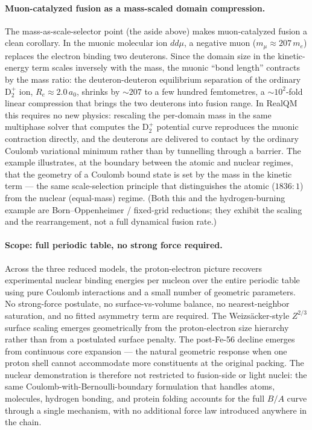 \documentclass[11pt]{article}
\begin{document}
\paragraph{Muon-catalyzed fusion as a mass-scaled domain compression.}
The mass-as-scale-selector point (the aside above) makes muon-catalyzed fusion a clean corollary. In
the muonic molecular ion $dd\mu$, a negative muon ($m_\mu \approx 207\,m_e$) replaces the electron
binding two deuterons. Since the domain size in the kinetic-energy term scales inversely with the
mass, the muonic ``bond length'' contracts by the mass ratio: the deuteron-deuteron equilibrium
separation of the ordinary $\mathrm{D}_2^+$ ion, $R_e \approx 2.0\,a_0$, shrinks by $\sim\! 207$ to a
few hundred femtometres, a $\sim\!10^2$-fold linear compression that brings the two deuterons into
fusion range. In RealQM this requires no new physics: rescaling the per-domain mass in the same
multiphase solver that computes the $\mathrm{D}_2^+$ potential curve reproduces the muonic contraction
directly, and the deuterons are delivered to contact by the ordinary Coulomb variational minimum
rather than by tunnelling through a barrier. The example illustrates, at the boundary between the
atomic and nuclear regimes, that the geometry of a Coulomb bound state is set by the mass in the
kinetic term --- the same scale-selection principle that distinguishes the atomic ($1836{:}1$) from
the nuclear (equal-mass) regime. (Both this and the hydrogen-burning example are Born--Oppenheimer /
fixed-grid reductions; they exhibit the scaling and the rearrangement, not a full dynamical fusion
rate.)

\paragraph{Scope: full periodic table, no strong force required.}
Across the three reduced models, the proton-electron picture recovers experimental nuclear binding energies per nucleon over the entire periodic table using pure Coulomb interactions and a small number of geometric parameters. No strong-force postulate, no surface-vs-volume balance, no nearest-neighbor saturation, and no fitted asymmetry term are required. The Weizsäcker-style $Z^{2/3}$ surface scaling emerges geometrically from the proton-electron size hierarchy rather than from a postulated surface penalty. The post-Fe-56 decline emerges from continuous core expansion --- the natural geometric response when one proton shell cannot accommodate more constituents at the original packing. The nuclear demonstration is therefore not restricted to fusion-side or light nuclei: the same Coulomb-with-Bernoulli-boundary formulation that handles atoms, molecules, hydrogen bonding, and protein folding accounts for the full $B/A$ curve through a single mechanism, with no additional force law introduced anywhere in the chain.
\end{document}
